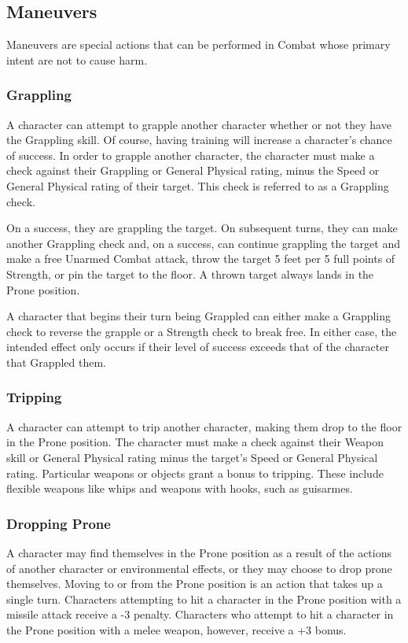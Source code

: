 \documentclass[oneside]{book}
\begin{document}
\begin{multicols}{2}
\section{Maneuvers}
Maneuvers are special actions that can be performed in Combat whose primary intent are not to cause harm. 

\subsubsection{Grappling}
A character can attempt to grapple another character whether or not they have the Grappling skill. Of course, having training will increase a character's chance of success. In order to grapple another character, the character must make a check against their Grappling or General Physical rating, minus the Speed or General Physical rating of their target. This check is referred to as a Grappling check. 

On a success, they are grappling the target. On subsequent turns, they can make another Grappling check and, on a success, can continue grappling the target and make a free Unarmed Combat attack, throw the target 5 feet per 5 full points of Strength, or pin the target to the floor. A thrown target always lands in the Prone position.

A character that begins their turn being Grappled can either make a Grappling check to reverse the grapple or a Strength check to break free. In either case, the intended effect only occurs if their level of success exceeds that of the character that Grappled them. 

\subsubsection{Tripping}
A character can attempt to trip another character, making them drop to the floor in the Prone position. The character must make a check against their Weapon skill or General Physical rating minus the target's Speed or General Physical rating. Particular weapons or objects grant a bonus to tripping. These include flexible weapons like whips and weapons with hooks, such as guisarmes.

\subsubsection{Dropping Prone}
A character may find themselves in the Prone position as a result of the actions of another character or environmental effects, or they may choose to drop prone themselves. Moving to or from the Prone position is an action that takes up a single turn. Characters attempting to hit a character in the Prone position with a missile attack receive a -3 penalty. Characters who attempt to hit a character in the Prone position with a melee weapon, however, receive a +3 bonus. 


\end{multicols}
\end{document}
